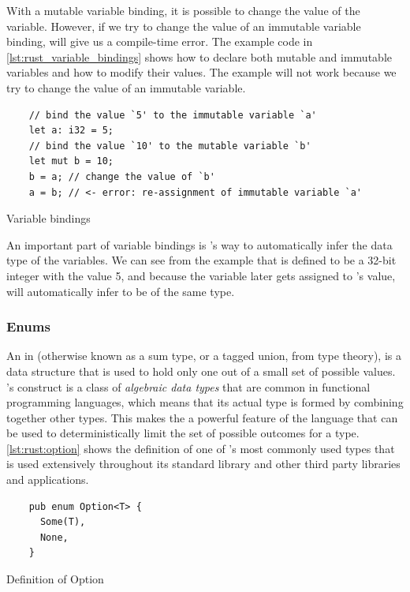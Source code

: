With a mutable variable binding, it is possible to change the value of the variable.
However, if we try to change the value of an immutable variable binding, {\rust} will give us a compile-time error.
The example code in \autoref{lst:rust_variable_bindings} shows how to declare both mutable and immutable variables and how to modify their values.
The example will not work because we try to change the value of an immutable variable.

\begin{listing}[H]
  \begin{verbatim}
    // bind the value `5' to the immutable variable `a'
    let a: i32 = 5;
    // bind the value `10' to the mutable variable `b'
    let mut b = 10;
    b = a; // change the value of `b'
    a = b; // <- error: re-assignment of immutable variable `a'
  \end{verbatim}
  \caption{Variable bindings}
  \label{lst:rust_variable_bindings}
\end{listing}

An important part of variable bindings is {\rust}'s way to automatically infer the data type of the variables.
We can see from the example that  is defined to be a 32-bit integer with the value 5, and because the variable  later gets assigned to 's value, {\rust} will automatically infer  to be of the same type.

\subsubsection{Enums}

An {\enum} in {\rust} (otherwise known as a sum type, or a tagged union, from type theory), is a data structure that is used to hold only one out of a small set of possible values.
\rust's {\enum} construct is a class of \emph{algebraic data types} that are common in functional programming languages, which means that its actual type is formed by combining together other types.
This makes the {\enum} a powerful feature of the language that can be used to deterministically limit the set of possible outcomes for a type.
\autoref{lst:rust:option} shows the definition of one of {\rust}'s most commonly used types that is used extensively throughout its standard library and other third party libraries and applications.

\begin{listing}[H]
  \begin{verbatim}
    pub enum Option<T> {
      Some(T),
      None,
    }
  \end{verbatim}
  \caption{Definition of Option}
  \label{lst:rust:option}
\end{listing}

